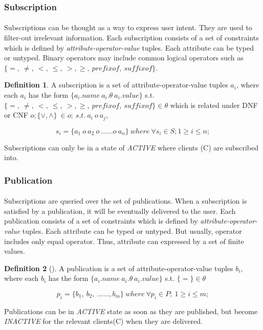 \documentclass[a4paper,12pt,oneside]{book}
\theoremstyle{definition}
\newtheorem{definition}{Definition}[section]
\theoremstyle{remark}
\begin{document}
\subsubsection{Subscription}
\paragraph*{}
Subscriptions can be thought as a way to express user intent. They are used to filter-out irrelevant information. Each subscription consists of a set of constraints which is defined by \emph{attribute-operator-value} tuples. Each attribute can be typed or untyped. Binary operators may include common logical operators such as $\{=,\ \neq,\ <,\ \leq,\ >, \geq,\ prefix of,\ suffix of\}$. 
\begin{definition}
A subscription is a set of attribute-operator-value tuples $a_i$, where each $a_i$ has the form $\{a_i.name\ a_i.\theta \ a_i.value \}$ s.t. $\{=,\ \neq,\ <,\ \leq,\ >, \geq,\ prefix of,\ suffix of\} \in \theta $  which is related under \ac{DNF} or \ac{CNF} $o; \{\vee,\wedge\}\ \in o;\ s.t.\ a_i\ o\ a_j $,  
\begin{center}
\[ s_i = \{ a_1\ o\ a_2\ o\ ......o\ a_n \}\ where\ \forall s_i \in S; 1 \geq i \leq n;\]
\end{center}
Subscriptions can only be in a state of \emph{ACTIVE} where clients (C) are subscribed into. 
\end{definition}

\subsubsection{Publication}
\paragraph*{}
Subscriptions are queried over the set of publications. When a subscription is satisfied by a publication, it will be eventually delivered to the user. Each publication consists of a set of constraints which is defined by \emph{attribute-operator-value} tuples. Each attribute can be typed or untyped. But usually, operator includes only equal operator. Thus, attribute can expressed by a set of finite values.
\begin{definition}[\label{def:bpub}]
A publication is a set of attribute-operator-value tuples $b_i$, where each $b_i$ has the form $\{a_i.name\ a_i.\theta \ a_i.value\}$ s.t. $\{=\} \in \theta $ 
\begin{center}
\[ p_i = \{ b_1,\ b_2,\ ......,b_m \}\ where\ \forall p_i \in P;\ 1 \geq i \leq m; \]
\end{center}
Publications can be in \emph{ACTIVE} state as soon as they are published, but become \emph{INACTIVE} for the relevant clients(C) when they are delivered.
\end{definition}
\end{document}
